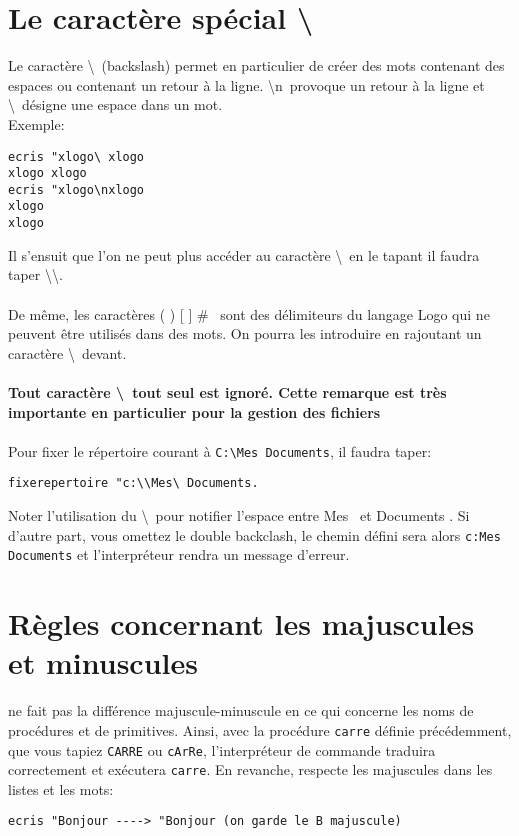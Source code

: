 \section{Le caractère spécial \og \textbackslash \fg}
Le caractère \og \textbackslash \fg \ (backslash) permet en particulier de créer des mots contenant des espaces ou contenant un retour à la ligne. \og \textbackslash n\fg \ provoque un retour à la ligne et \og \textbackslash\textvisiblespace\fg \ désigne une espace dans un mot. \\ Exemple:
\begin{verbatim}
ecris "xlogo\ xlogo
xlogo xlogo
ecris "xlogo\nxlogo
xlogo
xlogo
\end{verbatim}
Il s'ensuit que l'on ne peut plus accéder au caractère \og \textbackslash\fg \  en le tapant il faudra taper \og \textbackslash\textbackslash\fg.\\ \\
De même, les caractères \og ( ) [ ] \# \fg\  sont des délimiteurs du langage Logo qui ne peuvent être utilisés dans des mots. On pourra les introduire en rajoutant un caractère \og \textbackslash \fg\  devant. \\ \\
\textbf{Tout caractère \og \textbackslash \fg \ tout seul est ignoré. Cette remarque est très importante en particulier pour la gestion des fichiers}\\ \\
Pour fixer le répertoire courant à \texttt{C:\textbackslash Mes Documents}, il faudra taper:
\begin{verbatim}
fixerepertoire "c:\\Mes\ Documents.
\end{verbatim}
Noter l'utilisation du \og \textbackslash\textvisiblespace \fg \ pour notifier l'espace entre \og Mes \fg \ et \og Documents \fg. Si d'autre part, vous omettez le double backclash, le chemin défini sera alors \texttt{c:Mes Documents} et l'interpréteur rendra un message d'erreur.

\section{Règles concernant les majuscules et minuscules}

\xlogo ne fait pas la différence majuscule-minuscule en ce qui concerne les noms de procédures et de primitives. Ainsi, avec la procédure \texttt{carre} définie précédemment, que vous tapiez \texttt{CARRE} ou \texttt{cArRe}, l'interpréteur de commande traduira correctement et exécutera \texttt{carre}. En revanche, \xlogo respecte les majuscules dans les listes et les mots: \\
\begin{verbatim}
ecris "Bonjour ----> "Bonjour (on garde le B majuscule)
\end{verbatim}
